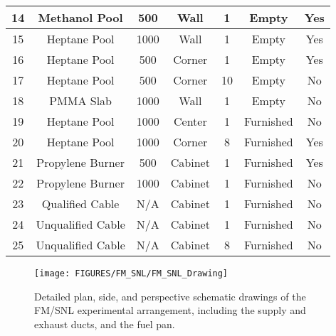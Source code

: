 \begin{table}[h!]
\begin{center}
\begin{tabular}{|c|c|c|c|c|c|c|}
14      & Methanol Pool     &     500       & Wall          & 1                 & Empty                 &        Yes \\ \hline
15      & Heptane Pool      &    1000       & Wall          & 1                 & Empty                 &        Yes \\ \hline
16      & Heptane Pool      &    500       & Corner        & 1                 & Empty                 &        Yes \\ \hline
17      & Heptane Pool      &    500       & Corner        & 10                & Empty                 &         No \\ \hline
18      &  PMMA Slab        &    1000       & Wall          & 1                 & Empty                 &         No \\ \hline
19      & Heptane Pool      &    1000       & Center        & 1                 & Furnished             &         No \\ \hline
20      & Heptane Pool      &    1000       & Corner        & 8                 & Furnished             &        Yes \\ \hline
21      & Propylene Burner  &     500       & Cabinet       & 1                 & Furnished             &        Yes \\ \hline
22      & Propylene Burner  &    1000       & Cabinet       & 1                 & Furnished             &         No \\ \hline
23      & Qualified Cable   &        N/A    & Cabinet       & 1                 & Furnished             &         No \\ \hline
24      & Unqualified Cable &        N/A    & Cabinet       & 1                 & Furnished             &         No \\ \hline
25      & Unqualified Cable &        N/A    & Cabinet       & 8                 & Furnished             &         No \\ \hline
\end{tabular}
\end{center}
\label{FM_SNL_Matrix}
\end{table}

\begin{figure}
\begin{center}
\texttt{[image: FIGURES/FM\_SNL/FM\_SNL\_Drawing]}\\
\end{center}
\caption{Detailed plan, side, and perspective schematic drawings of the FM/SNL experimental arrangement, including the supply and exhaust ducts, and the fuel pan.}
 \label{fig:FMSNL_Detailed}
\end{figure}

